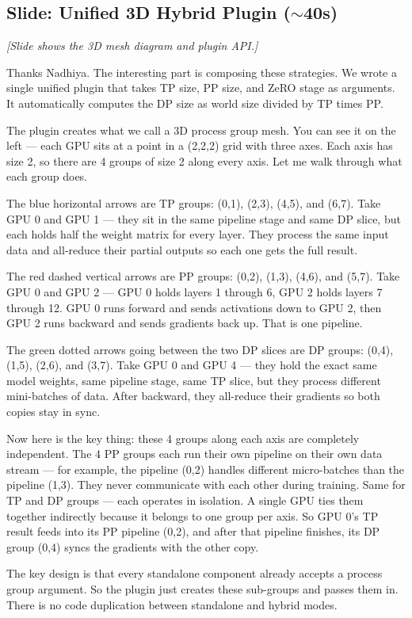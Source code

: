 \documentclass[11pt, a4paper]{article}
\begin{document}
\subsection{Slide: Unified 3D Hybrid Plugin ($\sim$40s)}
\textit{[Slide shows the 3D mesh diagram and plugin API.]}

Thanks Nadhiya. The interesting part is composing these strategies. We wrote a single unified plugin that takes TP size, PP size, and ZeRO stage as arguments. It automatically computes the DP size as world size divided by TP times PP.

The plugin creates what we call a 3D process group mesh. You can see it on the left --- each GPU sits at a point in a (2,2,2) grid with three axes. Each axis has size 2, so there are 4 groups of size 2 along every axis. Let me walk through what each group does.

The blue horizontal arrows are TP groups: (0,1), (2,3), (4,5), and (6,7). Take GPU 0 and GPU 1 --- they sit in the same pipeline stage and same DP slice, but each holds half the weight matrix for every layer. They process the same input data and all-reduce their partial outputs so each one gets the full result.

The red dashed vertical arrows are PP groups: (0,2), (1,3), (4,6), and (5,7). Take GPU 0 and GPU 2 --- GPU 0 holds layers 1 through 6, GPU 2 holds layers 7 through 12. GPU 0 runs forward and sends activations down to GPU 2, then GPU 2 runs backward and sends gradients back up. That is one pipeline.

The green dotted arrows going between the two DP slices are DP groups: (0,4), (1,5), (2,6), and (3,7). Take GPU 0 and GPU 4 --- they hold the exact same model weights, same pipeline stage, same TP slice, but they process different mini-batches of data. After backward, they all-reduce their gradients so both copies stay in sync.

Now here is the key thing: these 4 groups along each axis are completely independent. The 4 PP groups each run their own pipeline on their own data stream --- for example, the pipeline (0,2) handles different micro-batches than the pipeline (1,3). They never communicate with each other during training. Same for TP and DP groups --- each operates in isolation. A single GPU ties them together indirectly because it belongs to one group per axis. So GPU 0's TP result feeds into its PP pipeline (0,2), and after that pipeline finishes, its DP group (0,4) syncs the gradients with the other copy.

The key design is that every standalone component already accepts a process group argument. So the plugin just creates these sub-groups and passes them in. There is no code duplication between standalone and hybrid modes.
\end{document}
